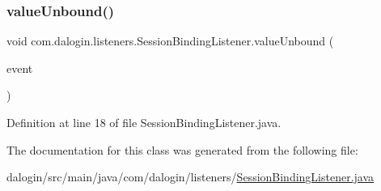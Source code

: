 \subsubsection{\texorpdfstring{value\+Unbound()}{valueUnbound()}}
{\footnotesize\ttfamily void com.\+dalogin.\+listeners.\+Session\+Binding\+Listener.\+value\+Unbound (\begin{DoxyParamCaption}\item[{Http\+Session\+Binding\+Event}]{event }\end{DoxyParamCaption})}



Definition at line 18 of file Session\+Binding\+Listener.\+java.



The documentation for this class was generated from the following file\+:\begin{DoxyCompactItemize}
\item 
dalogin/src/main/java/com/dalogin/listeners/\hyperlink{_session_binding_listener_8java}{Session\+Binding\+Listener.\+java}\end{DoxyCompactItemize}
